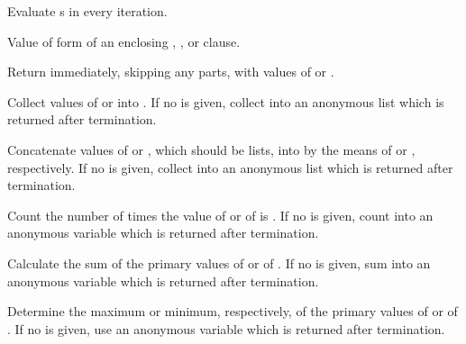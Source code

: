 \begin{LIST}{1cm}
\begin{LIST}{.5cm}
\begin{LIST}{.5cm}
\begin{LIST}{.5cm}
      \end{LIST}
    \end{LIST}
    
    {
    Evaluate s in every iteration.
    }

    {
      Value of  form of an enclosing ,
      , or  clause.
    }

    {
    Return immediately, skipping any  parts, with values of  or .
    }

    {
    Collect values of  or  into . If no
     is given, collect into an anonymous list which is
    returned after termination. 
    }

    {
    Concatenate values of  or , which should be
    lists, into  by the means of  or ,
    respectively.  If no  is given, collect into an
    anonymous list which is returned after termination. 
    }

    {
    Count the number of times the value of  or of  is \T.
    If no  is given, count into an anonymous variable
    which is returned after termination.
    }

    {
    Calculate the sum of the primary values of  or of .
    If no  is given, sum into an anonymous variable
    which is returned after termination.
    }

    {
    Determine the maximum or minimum, respectively, of the primary values of
     or of . 
    If no  is given, use an anonymous variable
    which is returned after termination.
    }


\end{LIST}
\end{LIST}
